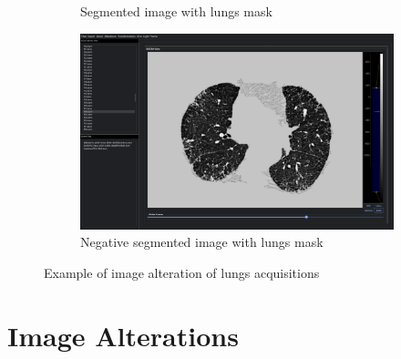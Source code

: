 \documentclass[conference]{IEEEtran}
\begin{document}
\begin{figure}[h]
\begin{subfigure}[b]{0.475\textwidth}
            \caption[]%
            {{\small Segmented image with lungs mask}}
            \label{fig:mean and std of net34}
        \end{subfigure}
        \hfill
        \begin{subfigure}[b]{0.475\textwidth}
            \includegraphics[width=\textwidth]{negative-segmented.png}
            \caption[]%
            {{\small Negative segmented image with lungs mask}}
            \label{fig:mean and std of net44}
        \end{subfigure}
        \caption[ The average and standard deviation of critical parameters ]
        {\small Example of image alteration of lungs acquisitions}
        \label{fig:mean and std of nets}
    \end{figure}

\section{Image Alterations}
\end{document}
